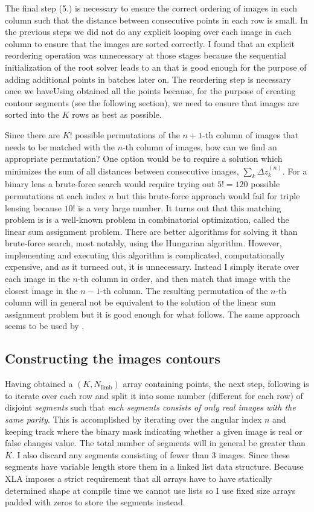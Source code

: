 \documentclass[12pt,dvipsnames]{report}
\newcommand{\ssf}[1]{\textsf{#1}}
\begin{document}
The final step (5.) is necessary to ensure the correct ordering of images in each column 
such that the distance between consecutive points in each row is small. 
In the previous steps we did not do any explicit looping over each image in each column to 
ensure that the images are sorted correctly. I found that an explicit reordering operation was 
unnecessary at those stages because the sequential initialization of the root solver leads to 
an that is good enough for the purpose of adding additional points in batches later on. 
The reordering step is necessary once we haveUsing  obtained all the points 
because, for the purpose of creating contour segments (see the following section), 
we need to ensure that images are sorted into the $K$ rows as best as possible. 

Since there are $K!$ possible permutations of the $n+1$-th column of images that needs to 
be matched with the $n$-th column of images, how can we find an appropriate permutation? 
One option  would be to require a solution which minimizes the sum of all distances 
between consecutive images, $\sum_k \Delta z^{(n)}_k$.
For a binary lens a brute-force search would require trying out $5!=120$ possible permutations 
at each index $n$ but this brute-force approach would fail for triple lensing because 
$10!$ is a very large number. It turns out that this matching problem is is a well-known problem 
in combinatorial optimization, called the \ssf{linear sum assignment problem}. There are better
algorithms for solving it than brute-force search, most notably, using the 
\ssf{Hungarian algorithm}. However, implementing and executing this algorithm is complicated, 
computationally expensive, and as it turneed out, it is unnecessary. Instead I simply iterate 
over each image in the $n$-th column in order, and then match that image with the closest image in 
the $n-1$-th column. 
The resulting permutation of the $n$-th column will in general not be equivalent to the solution 
of the linear sum assignment problem but it is good enough for what follows.
The same approach seems to be used by \citet{2021MNRAS.503.6143K}.

\subsection{Constructing the images contours}
Having obtained a $(K, N_\mathrm{limb})$ array containing points, the next step, following 
\citet{2021MNRAS.503.6143K} is to iterate over each row and split it into some number (different 
for each row) of disjoint \emph{segments} such that \emph{each segments consists of only real images 
with the same parity}. This is accomplished by iterating over the angular index $n$ and keeping
track where the binary mask indicating whether a given image is real or false changes value.
The total number of segments will in general be greater than $K$. I also discard any segments 
consisting  of fewer than 3 images.
Since these segments have variable length \citet{2021MNRAS.503.6143K} store them in a 
\ssf{linked list} data structure. Because \ssf{XLA} imposes a strict requirement that all 
arrays have to have statically determined shape at compile time we cannot use lists so I use 
fixed size arrays padded with zeros to store the segments instead. 
\end{document}
